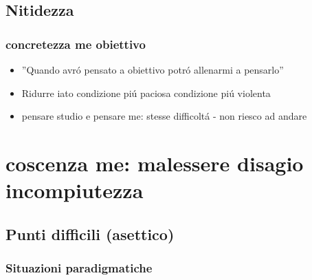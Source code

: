 \section{Nitidezza}

\subsection{concretezza me obiettivo}

\begin{itemize}
\item ''Quando avr\'o pensato a obiettivo potr\'o allenarmi a pensarlo''
\item Ridurre iato condizione pi\'u paciosa condizione pi\'u violenta
\item pensare studio e pensare me: stesse difficolt\'a - non riesco ad andare 
\end{itemize}

{\let\clearpage\relax
\chapter{coscenza me: malessere disagio incompiutezza}
}

\section{Punti difficili (asettico)}

\subsection{Situazioni paradigmatiche}


